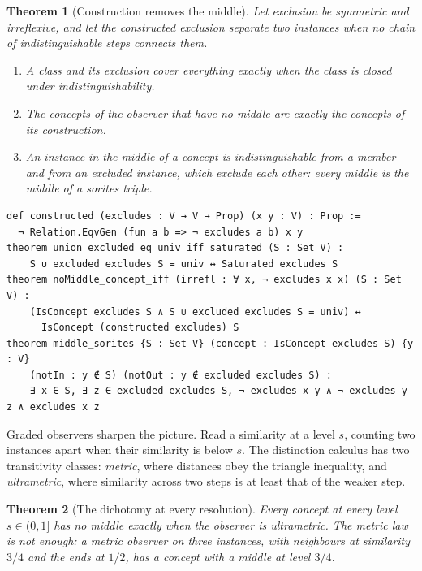\documentclass[11pt]{article}
\theoremstyle{plain}
\newtheorem{theorem}{Theorem}[section]
\theoremstyle{definition}
\begin{document}
\begin{theorem}[Construction removes the middle]
Let exclusion be symmetric and irreflexive, and let the \emph{constructed} exclusion separate two
instances when no chain of indistinguishable steps connects them.
\begin{enumerate}
\item A class and its exclusion cover everything exactly when the class is closed under
indistinguishability.
\item The concepts of the observer that have no middle are exactly the concepts of its
construction.
\item An instance in the middle of a concept is indistinguishable from a member and from an
excluded instance, which exclude each other: every middle is the middle of a sorites triple.
\end{enumerate}
\end{theorem}

\begin{lstlisting}
def constructed (excludes : V → V → Prop) (x y : V) : Prop :=
  ¬ Relation.EqvGen (fun a b => ¬ excludes a b) x y
theorem union_excluded_eq_univ_iff_saturated (S : Set V) :
    S ∪ excluded excludes S = univ ↔ Saturated excludes S
theorem noMiddle_concept_iff (irrefl : ∀ x, ¬ excludes x x) (S : Set V) :
    (IsConcept excludes S ∧ S ∪ excluded excludes S = univ) ↔
      IsConcept (constructed excludes) S
theorem middle_sorites {S : Set V} (concept : IsConcept excludes S) {y : V}
    (notIn : y ∉ S) (notOut : y ∉ excluded excludes S) :
    ∃ x ∈ S, ∃ z ∈ excluded excludes S, ¬ excludes x y ∧ ¬ excludes y z ∧ excludes x z
\end{lstlisting}

\noindent Graded observers sharpen the picture. Read a similarity at a level $s$, counting two
instances apart when their similarity is below $s$. The distinction calculus has two transitivity
classes: \emph{metric}, where distances obey the triangle inequality, and \emph{ultrametric},
where similarity across two steps is at least that of the weaker step.

\begin{theorem}[The dichotomy at every resolution]
Every concept at every level $s\in(0,1]$ has no middle exactly when the observer is ultrametric.
The metric law is not enough: a metric observer on three instances, with neighbours at similarity
$3/4$ and the ends at $1/2$, has a concept with a middle at level $3/4$.
\end{theorem}
\end{document}
